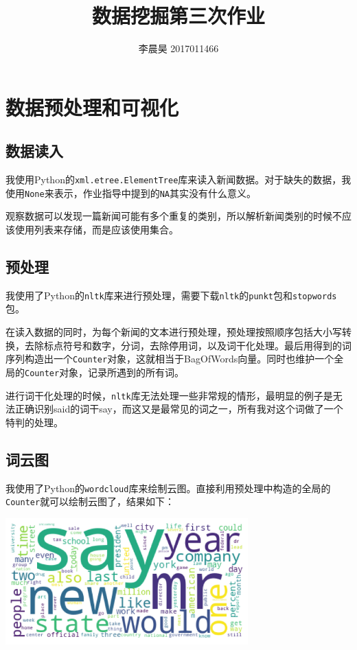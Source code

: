 \documentclass[12pt, UTF8]{article}
\title{数据挖掘第三次作业}
\author{李晨昊 2017011466}
\begin{document}
\maketitle
\tableofcontents

\section{数据预处理和可视化}
\subsection{数据读入}
我使用Python的\lstinline|xml.etree.ElementTree|库来读入新闻数据。对于缺失的数据，我使用\lstinline|None|来表示，作业指导中提到的\lstinline|NA|其实没有什么意义。

观察数据可以发现一篇新闻可能有多个重复的类别，所以解析新闻类别的时候不应该使用列表来存储，而是应该使用集合。

\subsection{预处理}
我使用了Python的\lstinline|nltk|库来进行预处理，需要下载\lstinline|nltk|的\lstinline|punkt|包和\lstinline|stopwords|包。

在读入数据的同时，为每个新闻的文本进行预处理，预处理按照顺序包括大小写转换，去除标点符号和数字，分词，去除停用词，以及词干化处理。最后用得到的词序列构造出一个\lstinline|Counter|对象，这就相当于BagOfWords向量。同时也维护一个全局的\lstinline|Counter|对象，记录所遇到的所有词。

进行词干化处理的时候，\lstinline|nltk|库无法处理一些非常规的情形，最明显的例子是无法正确识别said的词干say，而这又是最常见的词之一，所有我对这个词做了一个特判的处理。

\subsection{词云图}
我使用了Python的\lstinline|wordcloud|库来绘制云图。直接利用预处理中构造的全局的\lstinline|Counter|就可以绘制云图了，结果如下：

\begin{center}
  \includegraphics[width=0.7\textwidth]{wordcloud.png}
\end{center}
\end{document}
